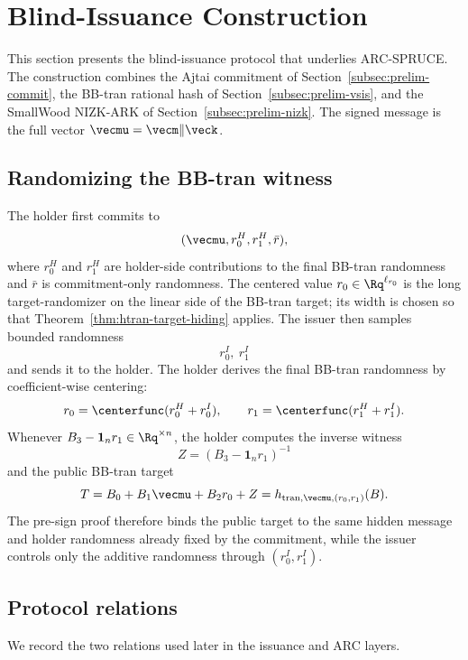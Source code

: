 \section{Blind-Issuance Construction}
\label{sec:blind-signature}

This section presents the blind-issuance protocol that underlies ARC-SPRUCE.  The construction combines the
Ajtai commitment of Section~\ref{subsec:prelim-commit}, the BB-tran rational hash of
Section~\ref{subsec:prelim-vsis}, and the SmallWood NIZK-ARK of Section~\ref{subsec:prelim-nizk}.  The
signed message is the full vector $\vecmu=\vecm\Vert\veck$.

\subsection{Randomizing the BB-tran witness}
The holder first commits to
\[
  (\vecmu,r_0^H,r_1^H,\bar r),
\]
where $r_0^H$ and $r_1^H$ are holder-side contributions to the final BB-tran randomness and $\bar r$ is
commitment-only randomness.  The centered value $r_0\in\Rq^{\ell_{r_0}}$ is the long target-randomizer on the
linear side of the BB-tran target; its width is chosen so that Theorem~\ref{thm:htran-target-hiding} applies.
The issuer then samples bounded randomness
\[
  r_0^I,\ r_1^I
\]
and sends it to the holder.  The holder derives the final BB-tran randomness by coefficient-wise centering:
\begin{equation}
  r_0=\centerfunc(r_0^H+r_0^I),
  \qquad
  r_1=\centerfunc(r_1^H+r_1^I).
  \label{eq:bs-centered-randomness}
\end{equation}
Whenever $B_3-\mathbf 1_n r_1\in\Rq^{\times n}$, the holder computes the inverse witness
\[
  Z=(B_3-\mathbf 1_n r_1)^{-1}
\]
and the public BB-tran target
\begin{equation}
  T=B_0+B_1\vecmu+B_2r_0+Z
  =h_{\mathrm{tran},\vecmu,(r_0,r_1)}(B).
  \label{eq:bs-public-target}
\end{equation}
The pre-sign proof therefore binds the public target to the same hidden message and holder randomness already
fixed by the commitment, while the issuer controls only the additive randomness through
$(r_0^I,r_1^I)$.

\subsection{Protocol relations}
We record the two relations used later in the issuance and ARC layers.

